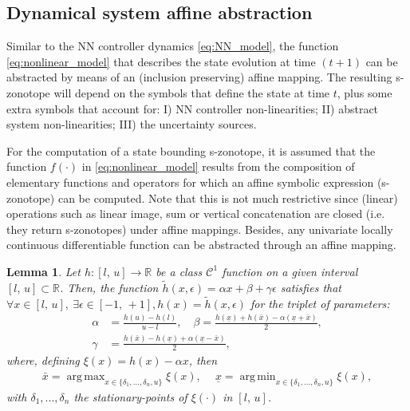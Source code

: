 \documentclass[journal]{IEEEtran}
\newtheorem{mylemma}{Lemma}
\DeclareMathOperator*{\argmax}{arg\,max}
\DeclareMathOperator*{\argmin}{arg\,min}
\begin{document}

\subsection{Dynamical system affine abstraction} \label{sec:system_abs_linear}

Similar to the NN controller dynamics \eqref{eq:NN_model}, the  function \eqref{eq:nonlinear_model} that describes the state evolution at time $(t+1)$ can be abstracted by means of an (inclusion preserving) affine mapping. The resulting s-zonotope will depend on  the symbols that define the state at time $t$, plus some extra symbols that account for:  I)  NN controller non-linearities; II) abstract system non-linearities; III) the uncertainty sources. 

For the computation of a state bounding s-zonotope, it is assumed that the function $f(\cdot)$ in \eqref{eq:nonlinear_model} results from the composition of elementary functions and operators for which an affine symbolic expression (s-zonotope) can be computed. Note that this is not much restrictive since (linear) operations such as linear image, sum or vertical concatenation are closed (i.e. they return s-zonotopes) under affine mappings. Besides, any univariate locally continuous differentiable function can be abstracted through an affine mapping.

\begin{mylemma} \label{lem:general_inclusion}
Let $h:[l, \, u] \to \mathbb{R}$ be a class $\mathcal{C}^1$  function on a given interval $[l, \, u] \subset \mathbb{R}$. Then, the function $\tilde{h}(x,\epsilon) = \alpha x + \beta + \gamma \epsilon$ satisfies that $\forall x \in [l, \, u], \ \exists \epsilon \in [-1, \, +1], h(x) = \tilde{h}(x,\epsilon)$ for the triplet of parameters:
\begin{equation*}
\begin{aligned}
        \alpha &= \frac{h(u)-h(l)}{u-l}, \quad \beta = \frac{h(\underline{x})+h(\bar{x})-\alpha(\underline{x}+\bar{x})}{2}, \\ \gamma &= \frac{h(\bar{x})-h(\underline{x})+\alpha(\underline{x}-\bar{x}) }{2},
\end{aligned}
\end{equation*}
where, defining $\xi(x) = h(x)-\alpha x$, then
\begin{equation*}
\begin{aligned}
    \bar{x} = \argmax_{x\in \{\delta_1,...,\delta_n,u\}}\xi(x),
     \quad \
    \underline{x} = \argmin_{x\in \{\delta_1,...,\delta_n,u\}}\xi(x),
\end{aligned}
\end{equation*}
with $\delta_1,...,\delta_n$  the stationary-points of $\xi(\cdot)$ in $[l, \, u]$. 
\end{mylemma}
\end{document}
